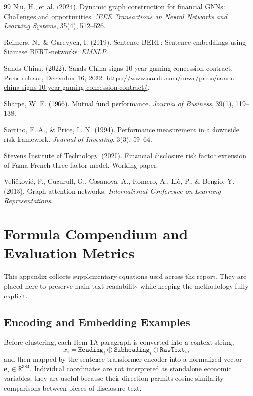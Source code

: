 \documentclass[11pt, a4paper]{article}
\begin{document}
\begin{thebibliography}{99}
     Niu, H., et al. (2024). Dynamic graph construction for financial GNNs: Challenges and opportunities. \textit{IEEE Transactions on Neural Networks and Learning Systems}, 35(4), 512--526.

     Reimers, N., \& Gurevych, I. (2019). Sentence-BERT: Sentence embeddings using Siamese BERT-networks. \textit{EMNLP}.

     Sands China. (2022). Sands China signs 10-year gaming concession contract. Press release, December 16, 2022. \url{https://www.sands.com/news/press/sands-china-signs-10-year-gaming-concession-contract/}.

     Sharpe, W. F. (1966). Mutual fund performance. \textit{Journal of Business}, 39(1), 119--138.

     Sortino, F. A., \& Price, L. N. (1994). Performance measurement in a downside risk framework. \textit{Journal of Investing}, 3(3), 59--64.

     Stevens Institute of Technology. (2020). Financial disclosure risk factor extension of Fama-French three-factor model. Working paper.

     Veli\v{c}kovi\'{c}, P., Cucurull, G., Casanova, A., Romero, A., Li\`{o}, P., \& Bengio, Y. (2018). Graph attention networks. \textit{International Conference on Learning Representations}.

    \end{thebibliography}

\newpage

\appendix
\renewcommand{\thesection}{\Alph{section}}

\section{Formula Compendium and Evaluation Metrics}
This appendix collects supplementary equations used across the report. They are placed here to preserve main-text readability while keeping the methodology fully explicit.

\subsection{Encoding and Embedding Examples}
Before clustering, each Item 1A paragraph is converted into a context string,
\[
x_i=\texttt{Heading}_i \oplus \texttt{Subheading}_i \oplus \texttt{RawText}_i,
\]
and then mapped by the sentence-transformer encoder into a normalized vector $\mathbf{e}_i\in\mathbb{R}^{384}$. Individual coordinates are not interpreted as standalone economic variables; they are useful because their direction permits cosine-similarity comparisons between pieces of disclosure text.
\end{document}
